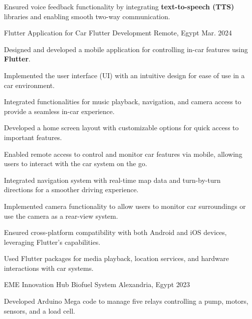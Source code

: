 \begin{cventries}
{\begin{cvitems}
    \item {Ensured voice feedback functionality by integrating \textbf{text-to-speech (TTS)} libraries and enabling smooth two-way communication.}
      \end{cvitems}
}  
\cventry
{\normalsize Flutter Application for Car} %
{\Large Flutter Development} %
{\normalsize Remote, Egypt} %
{\normalsize Mar. 2024} %
{
      \begin{cvitems} %
        \item {Designed and developed a mobile application for controlling in-car features using \textbf{Flutter}.}
    \item {Implemented the user interface (UI) with an intuitive design for ease of use in a car environment.}
    \item {Integrated functionalities for music playback, navigation, and camera access to provide a seamless in-car experience.}
    \item {Developed a home screen layout with customizable options for quick access to important features.}
    \item {Enabled remote access to control and monitor car features via mobile, allowing users to interact with the car system on the go.}
    \item {Integrated navigation system with real-time map data and turn-by-turn directions for a smoother driving experience.}
    \item {Implemented camera functionality to allow users to monitor car surroundings or use the camera as a rear-view system.}
    \item {Ensured cross-platform compatibility with both Android and iOS devices, leveraging Flutter's capabilities.}
    \item {Used Flutter packages for media playback, location services, and hardware interactions with car systems.}
      \end{cvitems}
}
\cventry
{\normalsize EME Innovation Hub} %
{\Large Biofuel System} %
{\normalsize Alexandria, Egypt} %
{\normalsize 2023} %
{
      \begin{cvitems} %
         \item {Developed Arduino Mega code to manage five relays controlling a pump, motors, sensors, and a load cell.}
      \end{cvitems}
}
\end{cventries}
